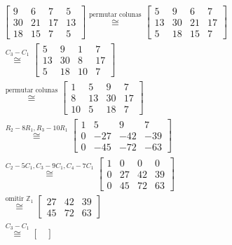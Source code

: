     	\begin{align*}
        	\begin{bmatrix}
        	9 & 6 & 7 & 5 \\
        	30 & 21 & 17 & 13 \\
        	18 & 15 & 7 & 5
        	\end{bmatrix} \stackrel{\text{permutar colunas}}{\cong} 
        	\begin{bmatrix}
        	5 & 9 & 6 & 7 \\
        	13 & 30 & 21 & 17 \\
        	5 & 18 & 15 & 7
        	\end{bmatrix}& \\ \stackrel{C_3 - C_1}{\cong}
        	\begin{bmatrix}
        	5 & 9 & 1 & 7 \\
        	13 & 30 & 8 & 17 \\
        	5 & 18 & 10 & 7
        	\end{bmatrix}& \\ \stackrel{\text{permutar colunas}}{\cong}
        	\begin{bmatrix}
        	1 & 5 & 9 & 7 \\
        	8 & 13 & 30 & 17 \\
        	10 & 5 & 18 & 7
        	\end{bmatrix}& \\ \stackrel{R_2 - 8R_1, R_3 - 10R_1}{\cong}
        	\begin{bmatrix}
        	1 & 5 & 9 & 7 \\
        	0 & -27 & -42 & -39 \\
        	0 & -45 & -72 & -63 
        	\end{bmatrix}& \\ \stackrel{C_2 - 5C_1, C_3 - 9C_1, C_4 - 7C_1}{\cong} 
        	\begin{bmatrix}
        	1 & 0 & 0 & 0 \\
        	0 & 27 & 42 & 39 \\
        	0 & 45 & 72 & 63
        	\end{bmatrix}& \\ \stackrel{\text{omitir }\mathbb{Z}_1}{\cong}
        	\begin{bmatrix}
        	27 & 42 & 39 \\
        	45 & 72 & 63
        	\end{bmatrix}& \\ \stackrel{C_3 - C_1}{\cong}
        	\begin{bmatrix}

\end{bmatrix}
\end{align*}
